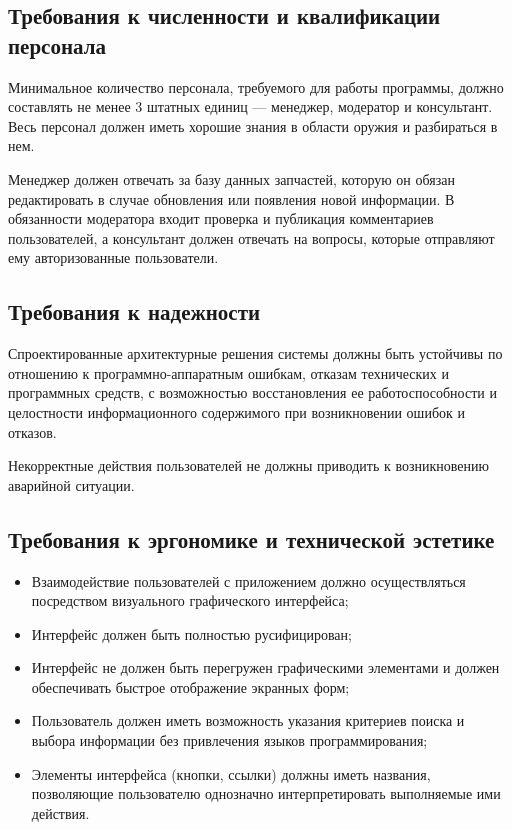 \documentclass[14pt]{extreport}
\begin{document}
\subsection{Требования к численности и квалификации персонала}
Минимальное количество персонала, требуемого для работы программы, должно
составлять не менее 3 штатных единиц — менеджер, модератор и консультант. Весь персонал должен иметь хорошие знания в области оружия и разбираться в нем.

Менеджер должен отвечать за базу данных запчастей, которую он обязан редактировать в случае обновления или появления новой информации.  В обязанности модератора входит проверка и публикация комментариев пользователей, а консультант должен отвечать на вопросы, которые отправляют ему авторизованные пользователи.

\subsection{Требования к надежности}
Спроектированные архитектурные решения системы должны быть устойчивы по отношению к программно-аппаратным ошибкам, отказам технических и программных средств, с возможностью восстановления ее работоспособности и целостности информационного содержимого при возникновении ошибок и отказов.

Некорректные действия пользователей не должны приводить к возникновению аварийной ситуации.

\subsection{Требования к эргономике и технической эстетике}
\begin{itemize}
	\item Взаимодействие пользователей с приложением должно осуществляться посредством визуального графического интерфейса;
	\item Интерфейс должен быть полностью русифицирован;
	\item Интерфейс не должен быть перегружен графическими элементами и должен обеспечивать быстрое отображение экранных форм;
	\item Пользователь должен иметь возможность указания критериев поиска и выбора информации без привлечения языков программирования;
	\item Элементы интерфейса (кнопки, ссылки) должны иметь названия, позволяющие пользователю однозначно интерпретировать выполняемые 
ими действия.
\end{itemize}
\end{document}
